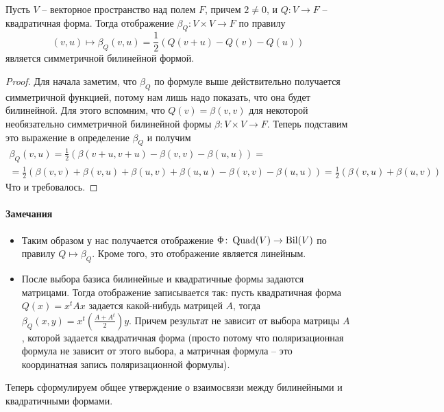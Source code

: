 \begin{claim}
Пусть $V$ -- векторное пространство над полем $F$, причем $2 \neq 0$, и $Q\colon V\to F$ -- квадратичная форма.
Тогда отображение $\beta_Q\colon V\times V\to F$ по правилу 
\[
(v,u)\mapsto \beta_Q(v, u) = \frac{1}{2}\left(Q(v+u) - Q(v) - Q(u)\right)
\]
является симметричной билинейной формой.
\end{claim}
\begin{proof}
Для начала заметим, что $\beta_Q$ по формуле выше действительно получается симметричной функцией, потому нам лишь надо показать, что она будет билинейной.
Для этого вспомним, что $Q(v) = \beta(v, v)$ для некоторой необязательно симметричной билинейной формы $\beta\colon V\times V\to F$.
Теперь подставим это выражение в определение $\beta_Q$ и получим
\begin{gather*}
\beta_Q(v, u) = \frac{1}{2}\left(\beta(v + u, v + u) - \beta(v, v) - \beta(u, u)\right) =\\
= \frac{1}{2}\left(\beta(v,v) + \beta(v, u) + \beta(u, v) + \beta(u,u)- \beta(v, v) - \beta(u, u)\right) = \frac{1}{2}\left(\beta(v, u) + \beta(u, v) \right)
\end{gather*}
Что и требовалось.
\end{proof}

\paragraph{Замечания}

\begin{itemize}
\item Таким образом у нас получается отображение $\Phi\colon\operatorname{Quad}(V) \to \operatorname{Bil}(V)$ по правилу $Q\mapsto \beta_Q$.
Кроме того, это отображение является линейным.

\item После выбора базиса билинейные и квадратичные формы задаются матрицами.
Тогда отображение записывается так: пусть квадратичная форма $Q(x) = x^t A x$ задается какой-нибудь матрицей $A$, тогда $\beta_Q(x, y) = x^t \left(\frac{A + A^t}{2}\right) y$.
Причем результат не зависит от выбора матрицы $A$, которой задается квадратичная форма (просто потому что поляризационная формула не зависит от этого выбора, а матричная формула -- это координатная запись поляризационной формулы).
\end{itemize}

Теперь сформулируем общее утверждение о взаимосвязи между билинейными и квадратичными формами.


